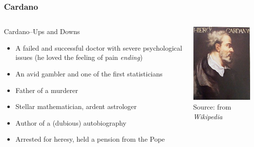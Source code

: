 \documentclass{beamer}
\begin{document}
\begin{frame}
\frametitle{Cardano}
\begin{columns}

    {
    \begin{block}{Cardano--Ups and Downs}
        \begin{itemize}
            \item A failed and successful doctor with severe
            psychological issues (he loved the feeling of pain
            \emph{ending})
            \item An avid gambler and one of the first statisticians
            \item Father of a murderer
            \item Stellar mathematician, ardent astrologer
            \item Author of a (dubious) autobiography
            \item Arrested for heresy, held a pension from the Pope
        \end{itemize}
    \end{block}
    }

    \includegraphics[width=\textwidth]{Gerolamo-Cardano}\\[-1ex]
    {\tiny Source: from \emph{Wikipedia}}
\end{columns}
\end{frame}
\end{document}
